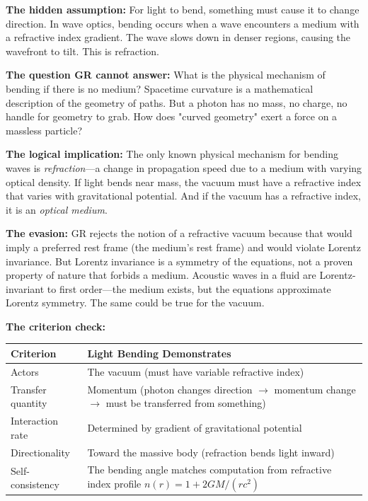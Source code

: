 \documentclass[12pt, a4paper]{article}
\begin{document}
\textbf{The hidden assumption:} For light to bend, something must cause it to change direction. In wave optics, bending occurs when a wave encounters a medium with a refractive index gradient. The wave slows down in denser regions, causing the wavefront to tilt. This is refraction.

\textbf{The question GR cannot answer:} What is the physical mechanism of bending if there is no medium? Spacetime curvature is a mathematical description of the geometry of paths. But a photon has no mass, no charge, no handle for geometry to grab. How does "curved geometry" exert a force on a massless particle?

\textbf{The logical implication:} The only known physical mechanism for bending waves is \textit{refraction}—a change in propagation speed due to a medium with varying optical density. If light bends near mass, the vacuum must have a refractive index that varies with gravitational potential. And if the vacuum has a refractive index, it is an \textit{optical medium}.

\textbf{The evasion:} GR rejects the notion of a refractive vacuum because that would imply a preferred rest frame (the medium's rest frame) and would violate Lorentz invariance. But Lorentz invariance is a symmetry of the equations, not a proven property of nature that forbids a medium. Acoustic waves in a fluid are Lorentz-invariant to first order—the medium exists, but the equations approximate Lorentz symmetry. The same could be true for the vacuum.

\textbf{The criterion check:}

\begin{center}
\begin{tabular}{|p{3cm}|p{10cm}|}
\hline
\textbf{Criterion} & \textbf{Light Bending Demonstrates} \\
\hline
Actors & The vacuum (must have variable refractive index) \\
\hline
Transfer quantity & Momentum (photon changes direction \(\rightarrow\) momentum change \(\rightarrow\) must be transferred from something) \\
\hline
Interaction rate & Determined by gradient of gravitational potential \\
\hline
Directionality & Toward the massive body (refraction bends light inward) \\
\hline
Self-consistency & The bending angle matches computation from refractive index profile \( n(r) = 1 + 2GM/(rc^2) \) \\
\hline
\end{tabular}
\end{center}
\end{document}
